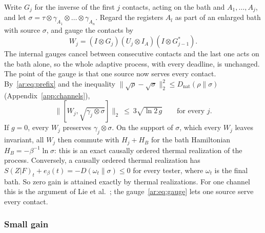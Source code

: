Write $G_j$ for the inverse of the first $j$ contacts, acting on the bath and $A_1,\dots,A_j$, and let $\sigma=\tau\otimes\gamma_{A_1}\otimes\dots\otimes\gamma_{A_n}$. Regard the registers $A_l$ as part of an enlarged bath with source $\sigma$, and gauge the contacts by
\begin{equation}\label{ar:eq:gauge}
W_j=(I\otimes G_j)(U_j\otimes I_A)(I\otimes G_{j-1}^*).
\end{equation}
The internal gauges cancel between consecutive contacts and the last one acts on the bath alone, so the whole adaptive process, with every deadline, is unchanged. The point of the gauge is that one source now serves every contact. By~\eqref{ar:eq:prefix} and the inequality $\|\sqrt\rho-\sqrt\sigma\|_2^2\le D_{\mathrm{nat}}(\rho\|\sigma)$ (Appendix~\ref{app:channels}),
\begin{equation}\label{ar:eq:common}
\bigl\|[W_j,\sqrt{\gamma_j\otimes\sigma}]\bigr\|_2\ \le\ 3\sqrt{\ln2\,g}\qquad\text{for every }j.
\end{equation}
If $g=0$, every $W_j$ preserves $\gamma_j\otimes\sigma$. On the support of $\sigma$, which every $W_j$ leaves invariant, all $W_j$ then commute with $H_j+H_B$ for the bath Hamiltonian $H_B=-\beta^{-1}\ln\sigma$: this is an exact causally ordered thermal realization of the process. Conversely, a causally ordered thermal realization has $S(Z|F)_t+e_\beta(t)=-D(\omega_t\|\sigma)\le0$ for every tester, where $\omega_t$ is the final bath. So zero gain is attained exactly by thermal realizations. For one channel this is the argument of Lie et al.~\cite[Prop.~4]{LieEtAl26}; the gauge~\eqref{ar:eq:gauge} lets one source serve every contact.

\subsubsection{Small gain}

